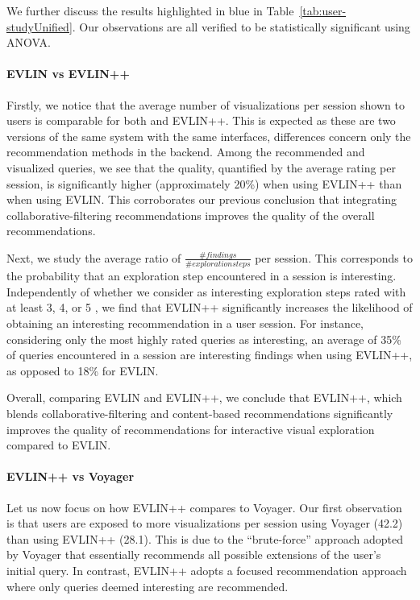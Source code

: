 We further discuss the results highlighted in blue in Table~\ref{tab:user-studyUnified}. Our observations are all verified to be statistically significant using ANOVA. 

 \paragraph{EVLIN vs EVLIN++} 
 Firstly, we notice that the average number of visualizations per session shown to users is comparable for both \prototype{} and EVLIN++. This is expected as these are two versions of the same system with the same interfaces, differences concern only the recommendation methods in the backend.
Among the recommended and visualized queries, we see that the quality, quantified by the average rating per session, is significantly higher (approximately 20\%) when using EVLIN++ than when using EVLIN. This corroborates our previous conclusion that integrating collaborative-filtering recommendations improves the quality of the overall recommendations.

Next, we study the average ratio of $\frac{\#findings}{ \#exploration steps}$   per session. This corresponds to the probability that an exploration step encountered in a session is interesting. Independently of whether we consider as interesting exploration steps rated with at least 3, 4, or 5 , we find that EVLIN++ significantly increases the likelihood of obtaining an interesting recommendation in a user session. For instance, considering only the most highly rated queries as interesting, an average of 35\% of queries encountered in a session are interesting findings when using EVLIN++, as opposed to 18\% for EVLIN. 

Overall, comparing EVLIN and EVLIN++, we conclude that EVLIN++, which blends collaborative-filtering and content-based recommendations significantly improves the quality of recommendations for interactive visual exploration compared to EVLIN.


 \paragraph{EVLIN++ vs Voyager}
 Let us now focus on how EVLIN++ compares to Voyager. Our first observation is that users are exposed to more visualizations per session using Voyager (42.2) than using EVLIN++ (28.1). This is due to the ``brute-force'' approach adopted by Voyager that essentially recommends all possible extensions of the user's initial query. In contrast, EVLIN++ adopts a focused recommendation approach where only queries deemed interesting are recommended. 
 
